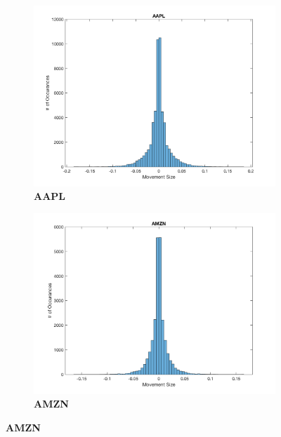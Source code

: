 \begin{figure}[htbp]

\centering
\begin{subfigure}[t]{0.49\textwidth}
\captionsetup{labelformat=empty}

\caption{\textbf{AAPL}}
\includegraphics[width=\textwidth, trim = 0 0 0 30, clip]{Tick_Histograms/AAPL_TickHist.png}

\end{subfigure}
\begin{subfigure}[t]{0.49\textwidth}
\captionsetup{labelformat=empty}

\caption{\textbf{AMZN}}
\includegraphics[width=\textwidth, trim = 0 0 0 30, clip]{Tick_Histograms/AMZN_TickHist.png}


\end{subfigure}
\end{figure}

